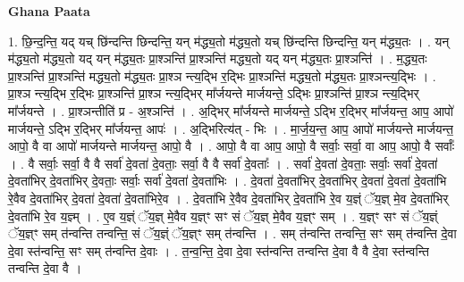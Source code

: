 \documentclass[17pt]{extarticle}
\begin{document}
\textbf{Ghana Paata } \newline

1. छि॒न्द॒न्ति॒ यद् यच् छि॑न्दन्ति छिन्दन्ति॒ यन् म॑द्ध्य॒तो म॑द्ध्य॒तो यच् छि॑न्दन्ति छिन्दन्ति॒ यन् म॑द्ध्य॒तः । . यन् म॑द्ध्य॒तो म॑द्ध्य॒तो यद् यन् म॑द्ध्य॒तः प्रा॒श्ञन्ति॑ प्रा॒श्ञन्ति॑ मद्ध्य॒तो यद् यन् म॑द्ध्य॒तः प्रा॒श्ञन्ति॑ । . म॒द्ध्य॒तः प्रा॒श्ञन्ति॑ प्रा॒श्ञन्ति॑ मद्ध्य॒तो म॑द्ध्य॒तः प्रा॒श्ञ न्त्य॒द्भि र॒द्भिः प्रा॒श्ञन्ति॑ मद्ध्य॒तो म॑द्ध्य॒तः प्रा॒श्ञन्त्य॒द्भिः । . प्रा॒श्ञ न्त्य॒द्भि र॒द्भिः प्रा॒श्ञन्ति॑ प्रा॒श्ञ न्त्य॒द्भिर् मा᳚र्जयन्ते मार्जयन्ते॒ ऽद्भिः प्रा॒श्ञन्ति॑ प्रा॒श्ञ न्त्य॒द्भिर् मा᳚र्जयन्ते । . प्रा॒श्ञन्तीति॑ प्र - अ॒श्ञन्ति॑ । . अ॒द्भिर् मा᳚र्जयन्ते मार्जयन्ते॒ ऽद्भि र॒द्भिर् मा᳚र्जयन्त॒ आप॒ आपो॑ मार्जयन्ते॒ ऽद्भि र॒द्भिर् मा᳚र्जयन्त॒ आपः॑ । . अ॒द्भिरित्य॑त् - भिः । . मा॒र्ज॒य॒न्त॒ आप॒ आपो॑ मार्जयन्ते मार्जयन्त॒ आपो॒ वै वा आपो॑ मार्जयन्ते मार्जयन्त॒ आपो॒ वै । . आपो॒ वै वा आप॒ आपो॒ वै सर्वाः॒ सर्वा॒ वा आप॒ आपो॒ वै सर्वाः᳚ । . वै सर्वाः॒ सर्वा॒ वै वै सर्वा॑ दे॒वता॑ दे॒वताः॒ सर्वा॒ वै वै सर्वा॑ दे॒वताः᳚ । . सर्वा॑ दे॒वता॑ दे॒वताः॒ सर्वाः॒ सर्वा॑ दे॒वता॑ दे॒वता॑भिर् दे॒वता॑भिर् दे॒वताः॒ सर्वाः॒ सर्वा॑ दे॒वता॑ दे॒वता॑भिः । . दे॒वता॑ दे॒वता॑भिर् दे॒वता॑भिर् दे॒वता॑ दे॒वता॑ दे॒वता॑भि रे॒वैव दे॒वता॑भिर् दे॒वता॑ दे॒वता॑ दे॒वता॑भिरे॒व । . दे॒वता॑भि रे॒वैव दे॒वता॑भिर् दे॒वता॑भि रे॒व य॒ज्ञ्ं ॅय॒ज्ञ् मे॒व दे॒वता॑भिर् दे॒वता॑भि रे॒व य॒ज्ञ्म् । . ए॒व य॒ज्ञ्ं ॅय॒ज्ञ् मे॒वैव य॒ज्ञ्ꣳ सꣳ सं ॅय॒ज्ञ् मे॒वैव य॒ज्ञ्ꣳ सम् । . य॒ज्ञ्ꣳ सꣳ सं ॅय॒ज्ञ्ं ॅय॒ज्ञ्ꣳ सम् त॑न्वन्ति तन्वन्ति॒ सं ॅय॒ज्ञ्ं ॅय॒ज्ञ्ꣳ सम् त॑न्वन्ति । . सम् त॑न्वन्ति तन्वन्ति॒ सꣳ सम् त॑न्वन्ति दे॒वा दे॒वा स्त॑न्वन्ति॒ सꣳ सम् त॑न्वन्ति दे॒वाः । . त॒न्व॒न्ति॒ दे॒वा दे॒वा स्त॑न्वन्ति तन्वन्ति दे॒वा वै वै दे॒वा स्त॑न्वन्ति तन्वन्ति दे॒वा वै । \newline
\end{document}
